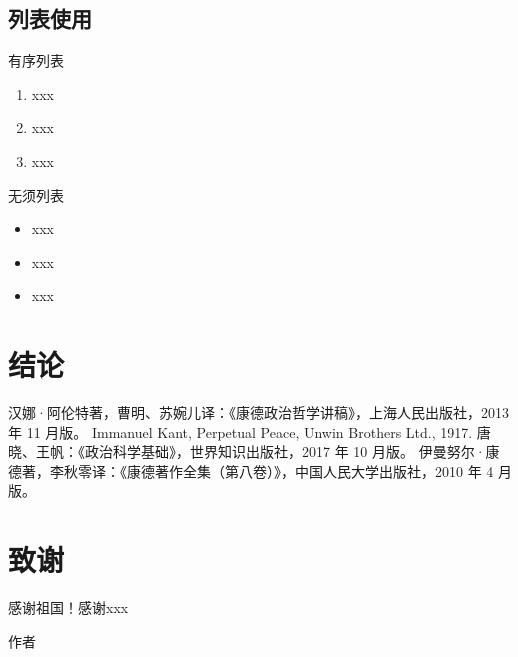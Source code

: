 \documentclass{BFSU-master-thesis}
\begin{document}
\section{列表使用}

有序列表

\begin{enumerate}
\item xxx
\item xxx
\item xxx
\end{enumerate}

无须列表

\begin{itemize}
\item xxx
\item xxx
\item xxx
\end{itemize}

\chapter{结论}

\zhlipsum            %


\cleardoublepage
{}

\begin{thebibliography}{99}
汉娜·阿伦特著，曹明、苏婉儿译：《康德政治哲学讲稿》，上海人民出版社，2013 年 11 月版。
Immanuel Kant, Perpetual Peace, Unwin Brothers Ltd., 1917.
唐晓、王帆：《政治科学基础》，世界知识出版社，2017 年 10 月版。
伊曼努尔·康德著，李秋零译：《康德著作全集（第八卷）》，中国人民大学出版社，2010 年 4 月版。
\end{thebibliography} 


\chapter*{致\quad 谢}

感谢祖国！感谢xxx

\zhlipsum[13]     %

\vspace*{4.5em}

\hfill 作者
\end{document}
